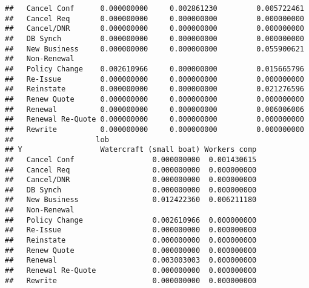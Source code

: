 \documentclass[]{article}
\begin{document}
\begin{verbatim}
##   Cancel Conf      0.000000000     0.002861230         0.005722461
##   Cancel Req       0.000000000     0.000000000         0.000000000
##   Cancel/DNR       0.000000000     0.000000000         0.000000000
##   DB Synch         0.000000000     0.000000000         0.000000000
##   New Business     0.000000000     0.000000000         0.055900621
##   Non-Renewal                                                     
##   Policy Change    0.002610966     0.000000000         0.015665796
##   Re-Issue         0.000000000     0.000000000         0.000000000
##   Reinstate        0.000000000     0.000000000         0.021276596
##   Renew Quote      0.000000000     0.000000000         0.000000000
##   Renewal          0.000000000     0.000000000         0.006006006
##   Renewal Re-Quote 0.000000000     0.000000000         0.000000000
##   Rewrite          0.000000000     0.000000000         0.000000000
##                   lob
## Y                  Watercraft (small boat) Workers comp
##   Cancel Conf                  0.000000000  0.001430615
##   Cancel Req                   0.000000000  0.000000000
##   Cancel/DNR                   0.000000000  0.000000000
##   DB Synch                     0.000000000  0.000000000
##   New Business                 0.012422360  0.006211180
##   Non-Renewal                                          
##   Policy Change                0.002610966  0.000000000
##   Re-Issue                     0.000000000  0.000000000
##   Reinstate                    0.000000000  0.000000000
##   Renew Quote                  0.000000000  0.000000000
##   Renewal                      0.003003003  0.000000000
##   Renewal Re-Quote             0.000000000  0.000000000
##   Rewrite                      0.000000000  0.000000000
\end{verbatim}
\end{document}
